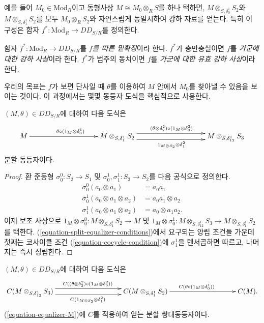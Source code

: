 \medskip\noindent
예를 들어 $M_0 \in \text{Mod}_R$이고 동형사상
$M \cong M_0 \otimes_R S$를 하나 택하면,
$M \otimes_{S,\delta^1_0} S_2$와 $M \otimes_{S,\delta^1_1} S_2$를
모두 $M_0 \otimes_R S_2$와 자연스럽게 동일시하여 강하 자료를 얻는다.
특히 이 구성은 함자 $f^*: \text{Mod}_R \to DD_{S/R}$를 정의한다.

\begin{definition}
\label{definition-effective-descent}
함자 $f^*: \text{Mod}_R \to DD_{S/R}$를
{\it $f$를 따른 밑확장}이라 한다. $f^*$가 충만충실이면 $f$를
{\it 가군에 대한 강하 사상}이라 한다. $f^*$가 범주의 동치이면
$f$를 {\it 가군에 대한 유효 강하 사상}이라 한다.
\end{definition}

\noindent
우리의 목표는 $f$가 보편 단사일 때 $\theta$를 이용하여 $M$ 안에서
$M_0$를 찾아낼 수 있음을 보이는 것이다. 이 과정에서는 몇몇 동등자
도식을 핵심적으로 사용한다.

\begin{lemma}
\label{lemma-equalizer-M}
$(M,\theta) \in DD_{S/R}$에 대하여 다음 도식은
\begin{equation}
\label{equation-equalizer-M}
\xymatrix@C=8pc{
M \ar[r]^{\theta \circ (1_M \otimes \delta_0^1)} &
M \otimes_{S, \delta_1^1} S_2
\ar@<1ex>[r]^{(\theta \otimes \delta_2^2) \circ (1_M \otimes \delta^2_0)}
\ar@<-1ex>[r]_{1_{M \otimes S_2} \otimes \delta^2_1} & 
M \otimes_{S, \delta_{12}^1} S_3
}
\end{equation}
분할 동등자이다.
\end{lemma}

\begin{proof}
환 준동형 $\sigma^0_0: S_2 \to S_1$ 및 $\sigma_0^1,
\sigma_1^1: S_3 \to S_2$를 다음 공식으로 정의한다.
\begin{align*}
\sigma^0_0 (a_0 \otimes a_1) & = a_0a_1 \\
\sigma^1_0 (a_0 \otimes a_1 \otimes a_2) & = a_0a_1 \otimes a_2 \\
\sigma^1_1 (a_0 \otimes a_1 \otimes a_2) & = a_0 \otimes a_1a_2.
\end{align*}
이제 보조 사상으로
$1_M \otimes \sigma_0^0: M \otimes_{S, \delta_1^1} S_2 \to M$
및 $1_M \otimes \sigma_0^1: M \otimes_{S,\delta_{12}^1} S_3 \to M \otimes_{S,
\delta_1^1} S_2$를 택한다.
(\ref{equation-split-equalizer-conditions})에서 요구되는 양립 조건들 가운데
첫째는 코사이클 조건 (\ref{equation-cocycle-condition})에
$\sigma_1^1$을 텐서곱하면 따르고, 나머지는 즉시 성립한다.
\end{proof}

\begin{lemma}
\label{lemma-equalizer-CM}
$(M, \theta) \in DD_{S/R}$에 대하여 다음 도식은
\begin{equation}
\label{equation-coequalizer-CM}
\xymatrix@C=8pc{
C(M \otimes_{S, \delta_{12}^1} S_3)
\ar@<1ex>[r]^{C((\theta \otimes \delta_2^2) \circ (1_M \otimes \delta^2_0))}
\ar@<-1ex>[r]_{C(1_{M \otimes S_2} \otimes \delta^2_1)} &
C(M \otimes_{S, \delta_1^1} S_2 )
\ar[r]^{C(\theta \circ (1_M \otimes \delta_0^1))} & C(M).
}
\end{equation}
(\ref{equation-equalizer-M})에 $C$를 적용하여 얻는 분할 쌍대동등자이다.
\end{lemma}

